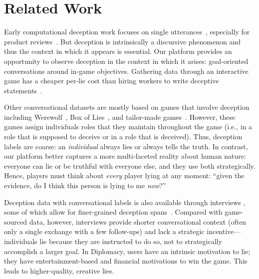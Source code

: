 \section{Related Work}
\label{sec:lit}

Early computational deception work focuses on single
utterances~\citep{NewmanLyingwordsPredicting2003}, especially for
product reviews~\citep{OttEstimatingPrevalenceDeception2012}.
But deception is intrinsically a discursive phenomenon and thus the
context in which it appears is essential.
%
Our platform provides an opportunity to observe deception in the
context in which it arises: goal-oriented conversations around in-game
objectives.
%
Gathering data through an interactive game has a cheaper per-lie cost than hiring workers to
write deceptive statements~\citep{jurgens2014s}. 


Other conversational datasets are mostly based on games that involve
deception including
Werewolf~\citep{GirleaPsycholinguisticFeaturesDeceptive2016}, Box of
Lies~\citep{SoldnerBoxLiesMultimodal2019}, and tailor-made games~\citep{HoEthicaldilemmaDeception2017}.
%
However, these games assign individuals roles
that they maintain throughout the game (i.e., in a role that is
supposed to deceive or in a role that is deceived).
%
Thus, deception labels are coarse: an \emph{individual} always lies or
always tells the truth.
%
In contrast, our platform better captures a more multi-faceted reality
about human nature: everyone can lie or be truthful with everyone
else, and they use both strategically.
%
Hence, players must think about \textit{every} player lying at any
moment: ``given the evidence, do I think this person is lying to me
\emph{now}?''



Deception data with conversational labels is also available through
interviews \citep{Perez-RosasVerbalNonverbalClues2016}, some of which
allow for finer-grained deception
spans~\citep{LevitanLinguisticCuesDeception2018}.
%
Compared with game-sourced data, however, interviews provide shorter
conversational context (often only a single exchange with a few follow-ups)
and lack a strategic incentive---individuals lie because they are
instructed to do so, not to strategically accomplish a larger
goal.
%
In Diplomacy, users have an intrinsic motivation to lie; they have
entertainment-based and financial motivations to win the game.
%
This leads to higher-quality, creative lies.


